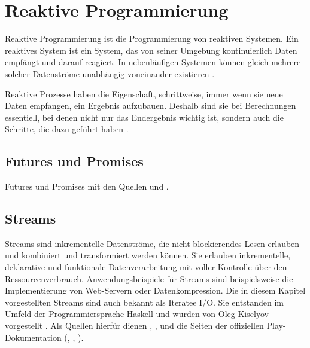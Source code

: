 
\chapter{Reaktive Programmierung} %
\label{cha:reaktive_programmierung}

Reaktive Programmierung ist die Programmierung von reaktiven Systemen.
Ein reaktives System ist ein System, das von seiner Umgebung kontinuierlich Daten empfängt und darauf reagiert.
In nebenläufigen Systemen können gleich mehrere solcher Datenströme unabhängig voneinander existieren \cite[vgl.][S.~1]{reactive_programming}.

Reaktive Prozesse haben die Eigenschaft, schrittweise, immer wenn sie neue Daten empfangen, ein Ergebnis aufzubauen.
Deshalb sind sie bei Berechnungen essentiell, bei denen nicht nur das Endergebnis wichtig ist, sondern auch die Schritte, die dazu geführt haben \cite[vgl.][S.~2]{reactive_programming1}.


\section{Futures und Promises} %
\label{sec:futures_und_promises}

Futures und Promises mit den Quellen \citealt{haller2013} und \citealt{typesafe2013}.



\section{Streams} %
\label{sec:streams}

Streams sind inkrementelle Datenströme, die nicht-blockierendes Lesen erlauben und kombiniert und transformiert werden können.
Sie erlauben inkrementelle, deklarative und funktionale Datenverarbeitung mit voller Kontrolle über den Ressourcenverbrauch.
Anwendungsbeispiele für Streams sind beispielsweise die Implementierung von Web-Servern oder Datenkompression.
Die in diesem Kapitel vorgestellten Streams sind auch bekannt als Iteratee I/O.
Sie entstanden im Umfeld der Programmiersprache Haskell und wurden von Oleg Kiselyov vorgestellt \cite[vgl.][S.~19]{monad_reader}.
Als Quellen hierfür dienen \citealt{kiselyov2012}, \citealt{iteratee_io}, \citealt{monad_reader} und die Seiten der offiziellen Play-Dokumentation (\citealt{iteratees}, \cite{enumerators}, \cite{play_api_documentation}).


